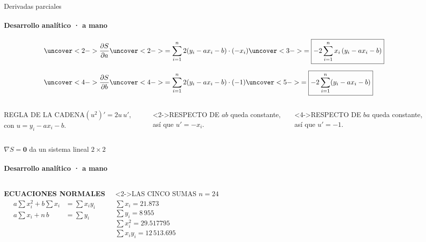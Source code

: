 \documentclass[aspectratio=169,11pt]{beamer}
\newcommand{\tarjeta}[3][]{%
  \begin{block}#1{\MakeUppercase{#2}}\small #3\end{block}}
\begin{document}
\begin{frame}{Derivadas parciales}
  \framesubtitle{Desarrollo analítico · a mano}
  \begin{align*}
    \uncover<2->{\frac{\partial S}{\partial a}} &\uncover<2->{= \sum_{i=1}^{n} 2(y_i - a x_i - b)\cdot(-x_i)} \uncover<3->{= \boxed{-2\sum_{i=1}^{n} x_i\,(y_i - a x_i - b)}} \\[0.6em]
    \uncover<4->{\frac{\partial S}{\partial b}} &\uncover<4->{= \sum_{i=1}^{n} 2(y_i - a x_i - b)\cdot(-1)} \uncover<5->{= \boxed{-2\sum_{i=1}^{n} (y_i - a x_i - b)}}
  \end{align*}
  \vfill
  \begin{columns}[T]
    \tarjeta{Regla de la cadena}{$(u^2)' = 2u\,u'$, con $u = y_i - a x_i - b$.}
    \tarjeta[<2->]{Respecto de $a$}{$b$ queda constante, así que $u' = -x_i$.}
    \tarjeta[<4->]{Respecto de $b$}{$a$ queda constante, así que $u' = -1$.}
  \end{columns}
\end{frame}

\begin{frame}{$\nabla S = \mathbf{0}$ da un sistema lineal $2\times 2$}
  \framesubtitle{Desarrollo analítico · a mano}
  \begin{columns}[c]
      {\scriptsize\bfseries\color{acento}ECUACIONES NORMALES}
      \begin{align*}
        a\sum x_i^2 + b\sum x_i &= \sum x_i y_i \\
        a\sum x_i + n\,b &= \sum y_i
      \end{align*}
      \tarjeta[<2->]{Las cinco sumas}{%
        $n = 24$\\[0.3em]
        $\sum x_i = 21.873$\\[0.3em]
        $\sum y_i = 8\,955$\\[0.3em]
        $\sum x_i^2 = 29.517795$\\[0.3em]
        $\sum x_i y_i = 12\,513.695$}
  \end{columns}
\end{frame}
\end{document}
